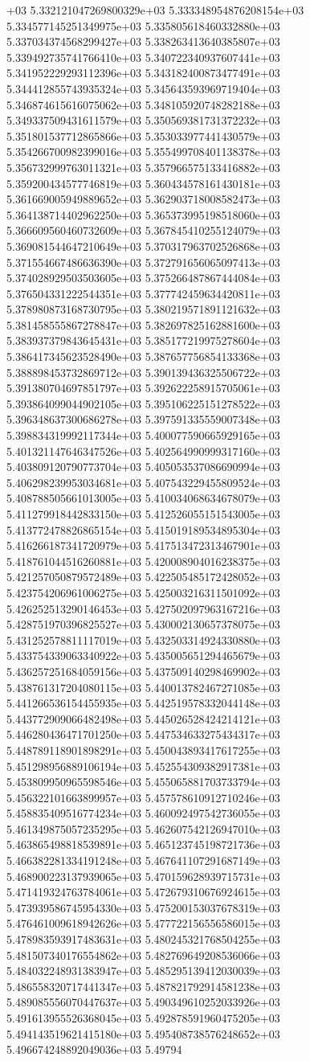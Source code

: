 +03	5.332121047269800329e+03	5.333348954876208154e+03	5.334577145251349975e+03	5.335805618460332880e+03	5.337034374568299427e+03	5.338263413640385807e+03	5.339492735741766410e+03	5.340722340937607441e+03	5.341952229293112396e+03	5.343182400873477491e+03	5.344412855743935324e+03	5.345643593969719404e+03	5.346874615616075062e+03	5.348105920748282188e+03	5.349337509431611579e+03	5.350569381731372232e+03	5.351801537712865866e+03	5.353033977441430579e+03	5.354266700982399016e+03	5.355499708401138378e+03	5.356732999763011321e+03	5.357966575133416882e+03	5.359200434577746819e+03	5.360434578161430181e+03	5.361669005949889652e+03	5.362903718008582473e+03	5.364138714402962250e+03	5.365373995198518060e+03	5.366609560460732609e+03	5.367845410255124079e+03	5.369081544647210649e+03	5.370317963702526868e+03	5.371554667486636390e+03	5.372791656065097413e+03	5.374028929503503605e+03	5.375266487867444084e+03	5.376504331222544351e+03	5.377742459634420811e+03	5.378980873168730795e+03	5.380219571891121632e+03	5.381458555867278847e+03	5.382697825162881600e+03	5.383937379843645431e+03	5.385177219975278604e+03	5.386417345623528490e+03	5.387657756854133368e+03	5.388898453732869712e+03	5.390139436325506722e+03	5.391380704697851797e+03	5.392622258915705061e+03	5.393864099044902105e+03	5.395106225151278522e+03	5.396348637300686278e+03	5.397591335559007348e+03	5.398834319992117344e+03	5.400077590665929165e+03	5.401321147646347526e+03	5.402564990999317160e+03	5.403809120790773704e+03	5.405053537086690994e+03	5.406298239953034681e+03	5.407543229455809524e+03	5.408788505661013005e+03	5.410034068634678079e+03	5.411279918442833150e+03	5.412526055151543005e+03	5.413772478826865154e+03	5.415019189534895304e+03	5.416266187341720979e+03	5.417513472313467901e+03	5.418761044516260881e+03	5.420008904016238375e+03	5.421257050879572489e+03	5.422505485172428052e+03	5.423754206961006275e+03	5.425003216311501092e+03	5.426252513290146453e+03	5.427502097963167216e+03	5.428751970396825527e+03	5.430002130657378075e+03	5.431252578811117019e+03	5.432503314924330880e+03	5.433754339063340922e+03	5.435005651294465679e+03	5.436257251684059156e+03	5.437509140298469902e+03	5.438761317204080115e+03	5.440013782467271085e+03	5.441266536154455935e+03	5.442519578332044148e+03	5.443772909066482498e+03	5.445026528424214121e+03	5.446280436471701250e+03	5.447534633275434317e+03	5.448789118901898291e+03	5.450043893417617255e+03	5.451298956889106194e+03	5.452554309382917381e+03	5.453809950965598546e+03	5.455065881703733794e+03	5.456322101663899957e+03	5.457578610912710246e+03	5.458835409516774234e+03	5.460092497542736055e+03	5.461349875057235295e+03	5.462607542126947010e+03	5.463865498818539891e+03	5.465123745198721736e+03	5.466382281334191248e+03	5.467641107291687149e+03	5.468900223137939065e+03	5.470159628939715731e+03	5.471419324763784061e+03	5.472679310676924615e+03	5.473939586745954330e+03	5.475200153037678319e+03	5.476461009618942626e+03	5.477722156556586015e+03	5.478983593917483631e+03	5.480245321768504255e+03	5.481507340176554862e+03	5.482769649208536066e+03	5.484032248931383947e+03	5.485295139412030039e+03	5.486558320717441347e+03	5.487821792914581238e+03	5.489085556070447637e+03	5.490349610252033926e+03	5.491613955526368045e+03	5.492878591960475205e+03	5.494143519621415180e+03	5.495408738576248652e+03	5.496674248892049036e+03	5.49794